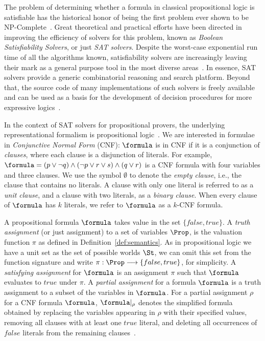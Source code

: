 The problem of determining whether a formula in classical propositional logic is
satisfiable has the historical honor of being the first problem ever shown to be
NP-Complete~\cite{Cook}. Great theoretical and practical efforts have been
directed in improving the efficiency of solvers for this problem, known as
\emph{Boolean Satisfiability Solvers}, or just \emph{SAT solvers}. Despite the
worst-case exponential run time of all the algorithms known, satisfiability
solvers are increasingly leaving their mark as a general purpose tool in the
most diverse areas~\cite{satchapter}. In essence, SAT solvers provide a generic
combinatorial reasoning and search platform. Beyond that, the source code
of many implementations of such solvers is freely available and can be
used as a basis for the development of decision procedures for more expressive
logics~\cite{giunchiglia2002sat}.

In the context of SAT solvers for propositional provers, the underlying
representational formalism is propositional logic~\cite{satchapter}. We are
interested in formulae in \emph{Conjunctive Normal Form} (CNF): $\formula$ is in
CNF if it is a conjunction of \emph{clauses}, where each clause is a disjunction
of literals. For example, $\formula = (p \lor \neg q) \land (\neg p \lor r \lor
s) \land (q \lor r)$ is a CNF formula with four variables and three clauses. 
We use the symbol $\emptyset$ to denote the \emph{empty clause}, i.e., the
clause that contains no literals. A clause with only one literal is referred to
as a \emph{unit clause}, and a clause with two literals, as a \emph{binary
clause}.  When every clause of $\formula$ has $k$ literals, we refer to
$\formula$ as a $k$-CNF formula.  

A propositional formula $\formula$ takes value in the set $\{false, true\}$. A
\emph{truth assignment} (or just assignment) to a set of variables $\Prop$, is
the valuation function $\pi$ as defined in Definition~\ref{def:semantics}. As in
propositional logic we have a unit set as the set of possible worlds $\St$, we
can omit this set from the function signature and write $\pi : \Prop \longrightarrow
\{false,true\}$, for simplicity. A \emph{satisfying assignment} for $\formula$
is an assignment $\pi$ such that $\formula$ evaluates to $true$ under $\pi$.  A
\emph{partial assignment} for a formula $\formula$ is a truth assignment to a
subset of the variables in $\formula$. For a partial assignment $\rho$ for a CNF
formula $\formula$, $\formula|_\rho$ denotes the simplified formula obtained by
replacing the variables appearing in $\rho$ with their specified values, removing
all clauses with at least one $true$ literal, and deleting all occurrences of
$false$ literals from the remaining clauses~\cite{satchapter}.

